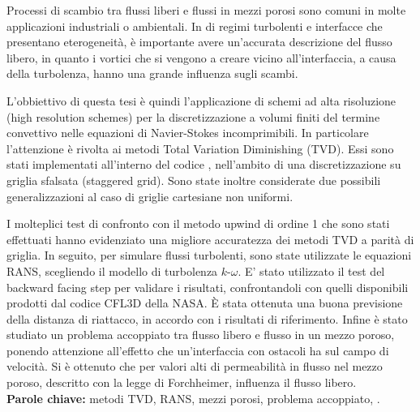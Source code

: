 Processi di scambio tra flussi liberi e flussi in mezzi porosi sono comuni in 
molte applicazioni industriali o ambientali. In di regimi turbolenti e 
interfacce che presentano eterogeneità, è importante avere un'accurata 
descrizione del flusso libero, in quanto i vortici che si vengono a creare 
vicino all'interfaccia, a causa della turbolenza, hanno una grande influenza 
sugli scambi.

L'obbiettivo di questa tesi è quindi l'applicazione di schemi ad alta 
risoluzione (high resolution schemes) per la discretizzazione a volumi finiti 
del termine convettivo nelle equazioni di Navier-Stokes incomprimibili. In 
particolare l'attenzione è rivolta ai metodi Total Variation Diminishing (TVD). 
Essi sono stati implementati all'interno del codice \DUMUX, nell'ambito di una 
discretizzazione su griglia sfalsata (staggered grid). Sono state inoltre 
considerate due possibili generalizzazioni al caso di griglie cartesiane non 
uniformi.

I molteplici test di confronto con il metodo upwind di ordine 1 che sono stati 
effettuati hanno evidenziato una migliore accuratezza dei metodi TVD a parità 
di griglia. 
In seguito, per simulare flussi turbolenti, sono state utilizzate le equazioni 
RANS, scegliendo il modello di turbolenza $k\text{-}\omega$. E' stato 
utilizzato il test del backward facing step per validare i risultati, 
confrontandoli con quelli disponibili prodotti dal codice CFL3D della NASA. È 
stata ottenuta una buona previsione della distanza di riattacco, in accordo con 
i risultati di riferimento. Infine è stato studiato un problema accoppiato tra 
flusso libero e flusso in un mezzo poroso, ponendo attenzione all'effetto che 
un'interfaccia con ostacoli ha sul campo di velocità. Si è ottenuto 
che per valori alti di permeabilità in flusso nel mezzo poroso, descritto con 
la legge di Forchheimer, influenza il flusso libero.
\\[\baselineskip]
\textbf{Parole chiave:} metodi TVD, RANS, mezzi porosi, problema accoppiato, 
\DUMUX.